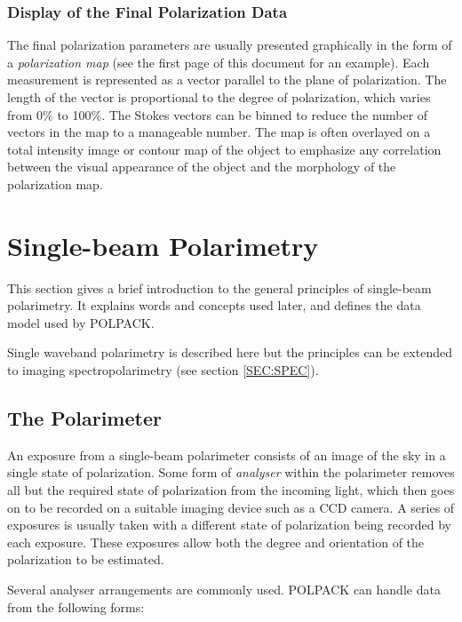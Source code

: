 \documentclass[twoside,11pt]{article}
\newcommand{\hyperref}[4]{#2\ref{#4}#3}
\newcommand{\xlabel}[1]{}
\renewcommand{\_}{\texttt{\symbol{95}}}
\begin{document}
\subsubsection{Display of the Final Polarization Data}
The final polarization parameters are usually presented graphically in
the form of a \emph{polarization map} (see the first page of this document
for an example). Each measurement is represented as a vector parallel to
the plane of polarization. The length of the vector is proportional to
the degree of polarization, which varies from 0\% to 100\%. The Stokes
vectors can be binned to reduce the number of vectors in the map to a
manageable number. The map is often overlayed on a total intensity image
or contour map of the object to emphasize any correlation between the
visual appearance of the object and the morphology of the polarization
map.

\section{\label{SEC:SBPOL}\xlabel{singlebeampolarimetry}Single-beam Polarimetry}
This section gives a brief introduction to the general principles of
single-beam polarimetry. It explains words and concepts used later, and
defines the data model used by POLPACK. 

Single waveband polarimetry is described here but the principles can be
extended to imaging spectropolarimetry (see \hyperref{here}{section }{}{SEC:SPEC}).

\subsection{\label{SEC:SBPOLARIM}The Polarimeter}
An exposure from a single-beam polarimeter consists of an image of the sky 
in a single state of polarization. Some form of \emph{analyser} within
the polarimeter removes all but the required state of polarization from
the incoming light, which then goes on to be recorded on a suitable
imaging device such as a CCD camera. A series of exposures is usually taken
with a different state of polarization being recorded by each exposure.
These exposures allow both the degree and orientation of the polarization
to be estimated.

Several analyser arrangements are commonly used. POLPACK can handle data 
from the following forms:
\end{document}
